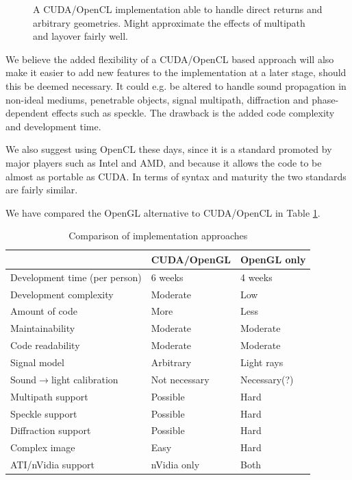 \documentclass[
   article                                      %
 , 12pt                                         %
 , xelatex                                      %
 , bibtex                                       %
 , layout
]{common/mytemplate}
\begin{document}
\begin{figure}[b]
\caption{A CUDA/OpenCL implementation able to handle direct returns and arbitrary geometries. Might approximate the effects of multipath and layover fairly well.}\label{single_path}
\end{figure}

We believe the added flexibility of a CUDA/OpenCL based approach will also make it easier to add new features to the implementation at a later stage, should this be deemed necessary. It could e.g. be altered to handle sound propagation in non-ideal mediums, penetrable objects, signal multipath, diffraction and phase-dependent effects such as speckle. The drawback is the added code complexity and development time.

We also suggest using OpenCL these days, since it is a standard promoted by major players such as Intel and AMD, and because it allows the code to be almost as portable as CUDA. In terms of syntax and maturity the two standards are fairly similar.

We have compared the OpenGL alternative to CUDA/OpenCL in Table \ref{comparison}.

\begin{table}[t]\centering
\begin{tabular}[c]{l l l}\hline
\rowcolor{tabBlue}                  & CUDA/OpenGL    & OpenGL only \\\hline
Development time (per person)       & 6 weeks        & 4 weeks     \\
Development complexity              & Moderate       & Low \\
Amount of code                      & More           & Less \\
Maintainability                     & Moderate       & Moderate \\
Code readability                    & Moderate       & Moderate \\
Signal model                        & Arbitrary      & Light rays  \\
Sound$\rightarrow$light calibration & Not necessary  & Necessary(?) \\
Multipath support                   & Possible       & Hard \\
Speckle support                     & Possible       & Hard \\
Diffraction support                 & Possible       & Hard \\
Complex image                       & Easy           & Hard \\
ATI/nVidia support                  & nVidia only    & Both \\
\end{tabular}
\vspace{5pt}\caption{Comparison of implementation approaches}\label{comparison}
\end{table}
\end{document}
